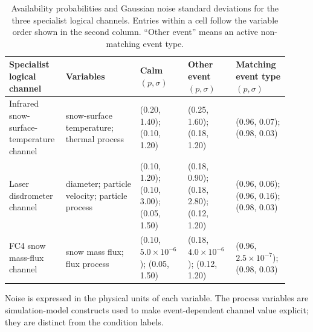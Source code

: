 \begin{table}[htbp]
  \centering
  \caption{Availability probabilities and Gaussian noise standard deviations for
  the three specialist logical channels. Entries within a cell follow the variable order
  shown in the second column. ``Other event'' means an active non-matching
  event type.}
  \label{tab:specialist_observation_model}
  \scriptsize
  \renewcommand{\arraystretch}{0.92}
  \setlength{\tabcolsep}{2.7pt}
  \begin{tabular}{@{}p{0.17\linewidth}p{0.25\linewidth}p{0.16\linewidth}p{0.16\linewidth}p{0.18\linewidth}@{}}
    \toprule
    Specialist logical channel & Variables & Calm $(p,\sigma)$ & Other event $(p,\sigma)$ & Matching event type $(p,\sigma)$ \\
    \midrule
    Infrared snow-surface-temperature channel
      & snow-surface temperature; thermal process
      & (0.20, 1.40); (0.10, 1.20)
      & (0.25, 1.60); (0.18, 1.20)
      & (0.96, 0.07); (0.98, 0.03) \\
    Laser disdrometer channel
      & diameter; particle velocity; particle process
      & (0.10, 1.20); (0.10, 3.00); (0.05, 1.50)
      & (0.18, 0.90); (0.18, 2.80); (0.12, 1.20)
      & (0.96, 0.06); (0.96, 0.16); (0.98, 0.03) \\
    FC4 snow mass-flux channel
      & snow mass flux; flux process
      & (0.10, $5.0\!\times\!10^{-6}$); (0.05, 1.50)
      & (0.18, $4.0\!\times\!10^{-6}$); (0.12, 1.20)
      & (0.96, $2.5\!\times\!10^{-7}$); (0.98, 0.03) \\
    \bottomrule
  \end{tabular}
  \vspace{0.4ex}

  \noindent\scriptsize
  Noise is expressed in the physical units of each variable. The process
  variables are simulation-model constructs used to make event-dependent channel
  value explicit; they are distinct from the condition labels.
\end{table}
